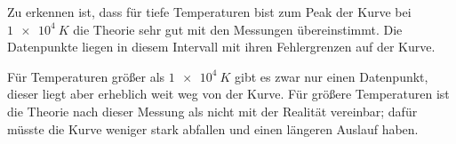 Zu erkennen ist, dass für tiefe Temperaturen bist zum Peak der Kurve bei $\SI{1e+4}{K}$ die Theorie sehr gut mit den Messungen übereinstimmt.
Die Datenpunkte liegen in diesem Intervall mit ihren Fehlergrenzen auf der Kurve.

Für Temperaturen größer als $\SI{1e+4}{K}$ gibt es zwar nur einen Datenpunkt, dieser liegt aber erheblich weit weg von der Kurve.
Für größere Temperaturen ist die Theorie nach dieser Messung als nicht mit der Realität vereinbar; dafür müsste die Kurve weniger stark abfallen und einen längeren Auslauf haben. %
